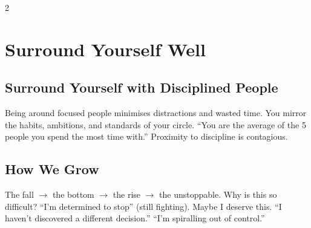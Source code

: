 \documentclass[10pt,a4paper]{article}
\begin{document}
\begin{multicols}{2}
\section{Surround Yourself Well}

\subsection{Surround Yourself with Disciplined People}
Being around focused people minimises distractions and wasted time. You mirror the habits, ambitions, and standards of your circle. ``You are the average of the 5 people you spend the most time with.'' Proximity to discipline is contagious.

\subsection{How We Grow}
The fall $\to$ the bottom $\to$ the rise $\to$ the unstoppable. Why is this so difficult? ``I'm determined to stop'' (still fighting). Maybe I deserve this. ``I haven't discovered a different decision.'' ``I'm spiralling out of control.''

\end{multicols}
\end{document}

